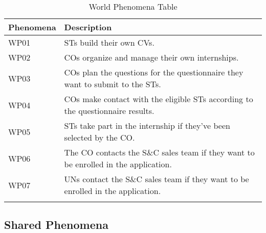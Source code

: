\begin{longtable}{|l|p{}|}
    \hline
    \textbf{Phenomena} & \textbf{Description}                                                                \\
    \hline \hline
    WP01               & STs build their own CVs.                                                            \\
    \hline
    WP02               & COs organize and manage their own internships.                                      \\
    \hline
    WP03               & COs plan the questions for the questionnaire they want to submit to the STs.        \\
    \hline
    WP04               & COs make contact with the eligible STs according to the questionnaire results.      \\
    \hline
    WP05               & STs take part in the internship if they've been selected by the CO.                 \\
    \hline
    WP06               & The CO contacts the S\&C sales team if they want to be enrolled in the application. \\
    \hline
    WP07               & UNs contact the S\&C sales team if they want to be enrolled in the application.     \\
    \hline
    \caption{World Phenomena Table}
    \label{tab:world-phenomena}
\end{longtable}

\subsection{Shared Phenomena}
\label{subsec:shared-phenomena}%

